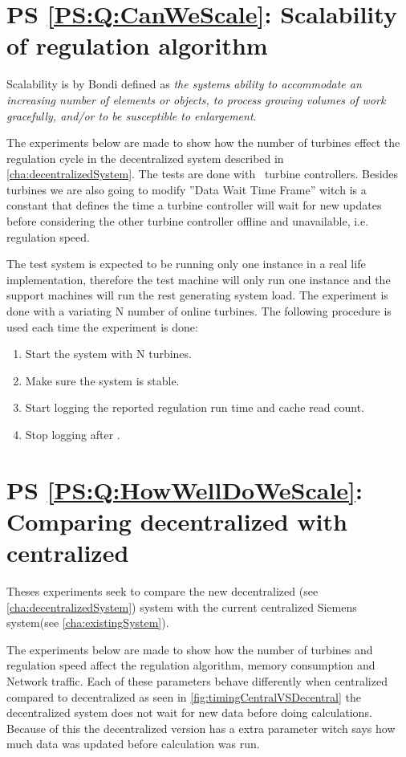 \section{PS \ref{PS:Q:CanWeScale}: Scalability of regulation algorithm}
Scalability is by Bondi\cite{Bondi:2000:CSI:350391.350432} defined as \textit{the systems ability to accommodate an increasing number of elements or objects, to process growing volumes of work gracefully, and/or to be susceptible to enlargement}.

The experiments below are made to show how the number of turbines effect the regulation cycle in the decentralized system described in \cref{cha:decentralizedSystem}.
The tests are done with \testTurbineNumbers ~turbine controllers. Besides turbines we are also going to modify ''Data Wait Time Frame'' witch is a constant that defines the time a turbine controller will wait for new updates before considering the other turbine controller offline and unavailable, i.e. regulation speed.

The test system is expected to be running only one instance in a real life implementation, therefore the test machine will only run one instance and the support machines will run the rest generating system load.
The experiment is done with a variating N number of online turbines.
The following procedure is used each time the experiment is done:
\begin{enumerate}
	\item Start the system with N turbines.
	\item Make sure the system is stable.
	\item Start logging the reported regulation run time and cache read count.
	\item Stop logging after \experiemntRunTime.
\end{enumerate}

\section{PS \ref{PS:Q:HowWellDoWeScale}: Comparing decentralized with centralized}
Theses experiments seek to compare the new decentralized (see \cref{cha:decentralizedSystem}) system with the current centralized Siemens system(see \cref{cha:existingSystem}).

The experiments below are made to show how the number of turbines and regulation speed affect the regulation algorithm, memory consumption and Network traffic.
Each of these parameters behave differently when centralized compared to decentralized as seen in \cref{fig:timingCentralVSDecentral} the decentralized system does not wait for new data before doing calculations. Because of this the decentralized version has a extra parameter witch says how much data was updated before calculation was run.

